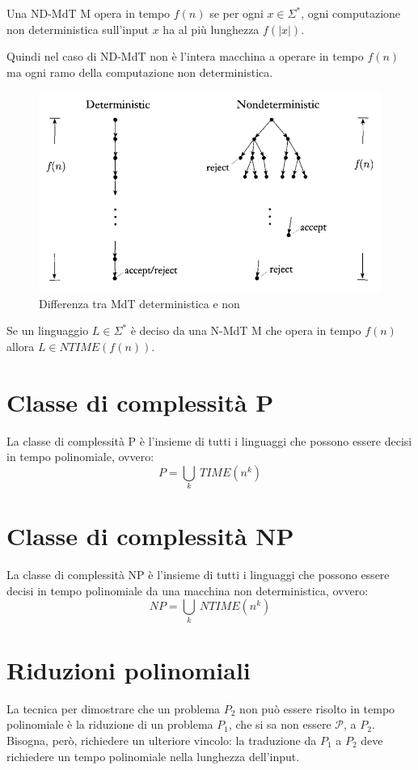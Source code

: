 \begin{definition}
    Una ND-MdT M opera in tempo $f(n)$ se per ogni $x \in \Sigma^*$, ogni computazione non deterministica sull'input $x$ ha al più lunghezza $f(|x|)$.
\end{definition}

Quindi nel caso di ND-MdT non è l'intera macchina a operare in tempo $f(n)$ ma ogni ramo della computazione non deterministica. 

\begin{figure}[H]
    \centering
    \includegraphics[width=0.5\linewidth]{Mdt e NMdt.png}
    \caption{Differenza tra MdT deterministica e non}
    \label{fig:enter-label}
\end{figure}

\begin{definition}
    Se un linguaggio $L\in \Sigma^*$ è deciso da una N-MdT M che opera in tempo $f(n)$ allora $L\in NTIME(f(n))$. 
\end{definition}

\section{Classe di complessità P ~\cite{5}} 
\begin{definition}
    La classe di complessità P è l'insieme di tutti i linguaggi che possono essere decisi in tempo polinomiale, ovvero:
    $$
    P = \bigcup_k \ TIME(n^k)
    $$
\end{definition}

\section{Classe di complessità NP \cite{5}}
\begin{definition}
    La classe di complessità NP è l'insieme di tutti i linguaggi che possono essere decisi in tempo polinomiale da una macchina non deterministica, ovvero:
    $$
    NP = \bigcup_k \ NTIME(n^k)
    $$
\end{definition}

\section{Riduzioni polinomiali}
La tecnica per dimostrare che un problema $P_2$ non può essere risolto in tempo polinomiale è la riduzione di un problema $P_1$, che si sa non essere $\mathcal{P}$, a $P_2$. 
Bisogna, però, richiedere un ulteriore vincolo: la traduzione da $P_1$ a $P_2$ deve richiedere un tempo polinomiale nella lunghezza dell'input.
 

